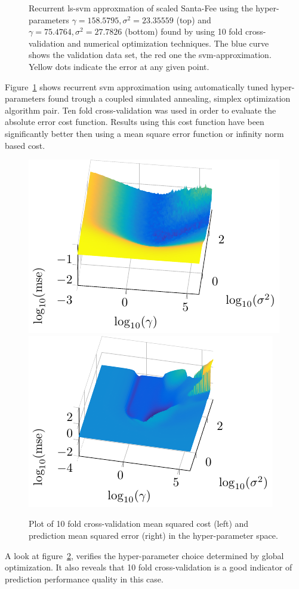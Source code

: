 \begin{figure}
\centering
\tikzset{mark size=1}


\caption{Recurrent ls-svm approxmation of scaled Santa-Fee using the hyper-parameters $\gamma =  158.5795, \sigma^2 = 23.35559$ (top) and $\gamma = 75.4764, \sigma^2 = 27.7826$ (bottom) found by using 10 fold cross-validation and numerical optimization techniques. The blue curve shows the validation data set, the red one the svm-approximation. Yellow dots indicate the error at any given point.}
\label{fig:santaFe}
\end{figure}
Figure~\ref{fig:santaFe} shows recurrent svm approximation using automatically tuned hyper-parameters found trough a coupled simulated annealing, simplex optimization algorithm pair. Ten fold cross-validation was used in order to evaluate the  absolute error cost function. Results using this cost function have been significantly better then using a mean square error function or infinity norm based cost. 
\begin{figure}
\centering
\includegraphics[width=0.45\linewidth]{../src/tikz/santaFe/santaFeParamSpace}
\includegraphics[width=0.45\linewidth]{../src/tikz/santaFe/santaFePredictionError}
\caption{Plot of 10 fold cross-validation mean squared cost (left) and prediction mean squared error (right) in the hyper-parameter space.}
\label{fig:santaFeHyperparameterSpace}
\end{figure}
A look at figure~\ref{fig:santaFeHyperparameterSpace}, verifies the hyper-parameter choice determined by global optimization. It also reveals that 10 fold cross-validation is a good indicator of prediction performance quality in this case. 
